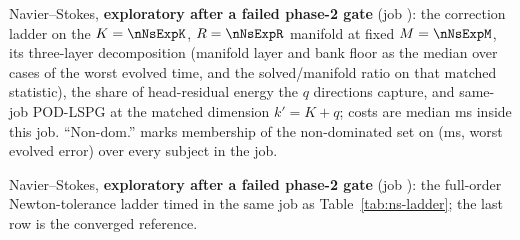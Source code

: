 \begin{table}[h]
\centering
\caption{Navier--Stokes, \textbf{exploratory after a failed phase-2 gate}
(job \provNsExpJob): the correction ladder on the $K=\nNsExpK$,
$R=\nNsExpR$ manifold at fixed $M=\nNsExpM$, its three-layer decomposition
(manifold layer and bank floor as the median over cases of the worst
evolved time, and the solved/manifold ratio on that matched statistic), the
share of head-residual energy the $q$ directions capture, and same-job
POD-LSPG at the matched dimension $k'=K+q$; costs are median ms inside this
job. ``Non-dom.'' marks membership of the non-dominated set on (ms, worst
evolved error) over every subject in the job.}
\label{tab:ns-ladder}
\resizebox{\linewidth}{!}{}
\end{table}

\begin{table}[h]
\centering
\caption{Navier--Stokes, \textbf{exploratory after a failed phase-2 gate}
(job \provNsExpJob): the full-order Newton-tolerance ladder timed in the
same job as Table~\ref{tab:ns-ladder}; the last row is the converged
reference.}
\label{tab:ns-fom}
\resizebox{0.7\linewidth}{!}{}
\end{table}

